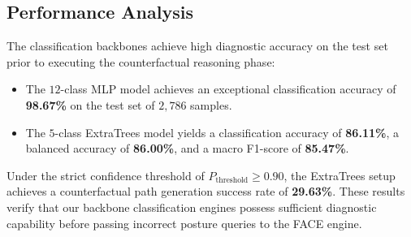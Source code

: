 \documentclass[pdflatex,sn-mathphys-num]{sn-jnl}%
\theoremstyle{thmstyleone}%
\theoremstyle{thmstyletwo}%
\theoremstyle{thmstylethree}%
\begin{document}
\subsection{Performance Analysis}
The classification backbones achieve high diagnostic accuracy on the test set prior to executing the counterfactual reasoning phase:
\begin{itemize}
    \item The $12$-class MLP model achieves an exceptional classification accuracy of \textbf{98.67\%} on the test set of $2,786$ samples.
    \item The $5$-class ExtraTrees model yields a classification accuracy of \textbf{86.11\%}, a balanced accuracy of \textbf{86.00\%}, and a macro F1-score of \textbf{85.47\%}.
\end{itemize}
Under the strict confidence threshold of $P_{\text{threshold}} \ge 0.90$, the ExtraTrees setup achieves a counterfactual path generation success rate of \textbf{29.63\%}. These results verify that our backbone classification engines possess sufficient diagnostic capability before passing incorrect posture queries to the FACE engine.
\end{document}
